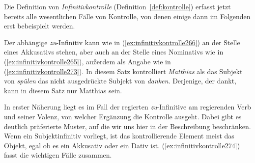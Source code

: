 \begin{exe}
  \ex\label{ex:infinitivkontrolle270}
  \begin{xlist}
  \end{xlist}
\end{exe}

Die Definition von \textit{Infinitivkontrolle} (Definition~\ref{def:kontrolle}) erfasst jetzt bereits alle wesentlichen Fälle von Kontrolle, von denen einige dann im Folgenden erst bebeispielt werden.


Der abhängige \textit{zu}-Infinitiv kann wie in (\ref{ex:infinitivkontrolle266}) an der Stelle eines Akkusativs stehen, aber auch an der Stelle eines Nominativs wie in (\ref{ex:infinitivkontrolle265}), außerdem als Angabe wie in (\ref{ex:infinitivkontrolle273}).
In diesem Satz kontrolliert \textit{Matthias} als das Subjekt von \textit{spülen} das nicht ausgedrückte Subjekt von \textit{danken}.
Derjenige, der dankt, kann in diesem Satz nur Matthias sein.

\begin{exe}
\end{exe}

In erster Näherung liegt es im Fall der regierten \textit{zu}-Infinitive am regierenden Verb und seiner Valenz, von welcher Ergänzung die Kontrolle ausgeht.
Dabei gibt es deutlich präferierte Muster, auf die wir uns hier in der Beschreibung beschränken.
Wenn ein Subjektinfinitiv vorliegt, ist das kontrollierende Element meist das Objekt, egal ob es ein Akkusativ oder ein Dativ ist.
(\ref{ex:infinitivkontrolle274}) fasst die wichtigen Fälle zusammen.

\begin{exe}
  \ex\label{ex:infinitivkontrolle274}
  \begin{xlist}
  \end{xlist}
\end{exe}

